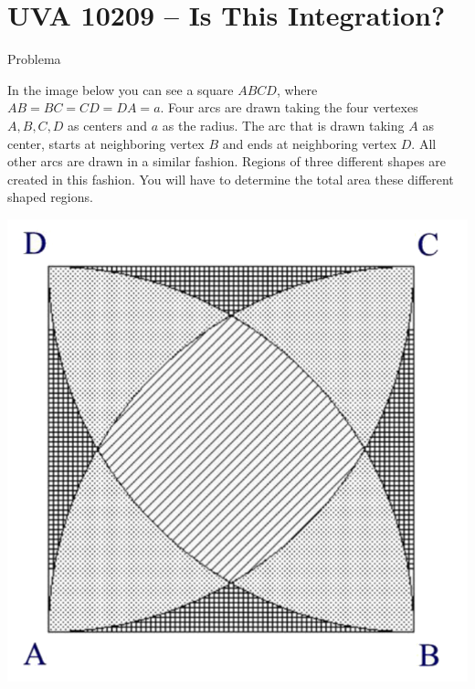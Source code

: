 \section{UVA 10209 -- Is This Integration?}

\begin{frame}[fragile]{Problema}

\begin{minipage}{0.45\textwidth}
In the image below you can see a square $ABCD$,
where $AB = BC = CD = DA = a$. Four arcs
are drawn taking the four vertexes $A, B, C, D$
as centers and $a$ as the radius. The arc that is
drawn taking $A$ as center, starts at neighboring
vertex $B$ and ends at neighboring vertex $D$. All
other arcs are drawn in a similar fashion. Regions of three different shapes are created in
this fashion. You will have to determine the
total area these different shaped regions.
\end{minipage}
\begin{minipage}{0.5\textwidth}
\begin{center}
\includegraphics[scale=0.75]{figure2.png}
\end{center}
\end{minipage}

\end{frame}

